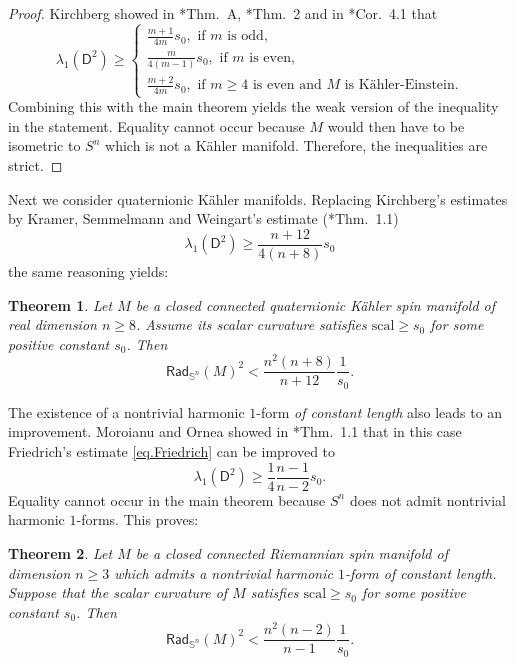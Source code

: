 \documentclass[11pt,reqno]{amsart}
\newcommand{\RadSn}{\mathsf{Rad}_{\Sn}}
\newcommand{\Sn}{\mathbb{S}^n}
\newcommand{\D}{\mathsf{D}}
\newcommand{\scal}{\mathrm{scal}}
\newcommand{\<}{\langle}
\renewcommand{\>}{\rangle}
\newtheorem{theorem}{Theorem}
\theoremstyle{definition}
\begin{document}
\begin{proof}
Kirchberg showed in \cite{K1}*{Thm.~A}, \cite{K2}*{Thm.~2} and in \cite{K3}*{Cor.~4.1} that 
$$
\lambda_1(\D^2) \ge 
\begin{cases}
\frac{m+1}{4m}s_0, \text{ if $m$ is odd},\\
\frac{m}{4(m-1)}s_0, \text{ if $m$ is even},\\
\frac{m+2}{4m}s_0, \text{ if $m\ge4$ is even and $M$ is Kähler-Einstein}.
\end{cases}
$$
Combining this with the main theorem yields the weak version of the inequality in the statement.
Equality cannot occur because $M$ would then have to be isometric to $S^n$ which is not a Kähler manifold.
Therefore, the inequalities are strict.
\end{proof}

Next we consider quaternionic Kähler manifolds.
Replacing Kirchberg's estimates by Kramer, Semmelmann and Weingart's estimate (\cite{KSW}*{Thm.~1.1})
$$
\lambda_1(\D^2) \ge \frac{n+12}{4(n+8)}s_0
$$
the same reasoning yields:

\begin{theorem}
Let $M$ be a closed connected quaternionic Kähler spin manifold of real dimension $n\ge8$.
Assume its scalar curvature satisfies $\scal\ge s_0$ for some positive constant $s_0$.
Then
\begin{equation}
\RadSn(M)^2 < \frac{n^2(n+8)}{n+12}\frac{1}{s_0}.
\tag{$\qed$}
\end{equation}
\end{theorem}

The existence of a nontrivial harmonic $1$-form \emph{of constant length} also leads to an improvement.
Moroianu and Ornea showed in \cite{MO}*{Thm.~1.1} that in this case Friedrich's estimate \eqref{eq.Friedrich} can be improved to 
\begin{equation*}
\lambda_1(\D^2) \ge \frac14\frac{n-1}{n-2}s_0 .
\label{eq.MO}
\end{equation*}
Equality cannot occur in the main theorem because $S^n$ does not admit nontrivial harmonic $1$-forms.
This proves:

\begin{theorem}
Let $M$ be a closed connected Riemannian spin manifold of dimension $n\ge3$ which admits a nontrivial harmonic $1$-form of constant length.
Suppose that the scalar curvature of $M$ satisfies $\scal\ge s_0$ for some positive constant $s_0$.
Then
\begin{equation}
\RadSn(M)^2 < \frac{n^2(n-2)}{n-1}\frac{1}{s_0}.
\tag{$\qed$}
\end{equation}
\end{theorem}
\end{document}
